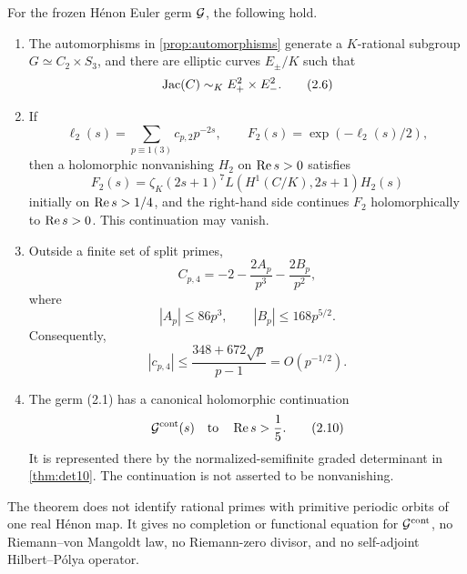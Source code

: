 \begin{theorem}\label{thm:main}
For the frozen H\'enon Euler germ \(\mathcal G\), the following hold.
\begin{enumerate}
\item The automorphisms in \cref{prop:automorphisms} generate a
\(K\)-rational subgroup \(G\simeq C_2\times S_3\), and there are elliptic
curves \(E_\pm/K\) such that
\[
 \operatorname{Jac}(C)\sim_K E_+^2\times E_-^2.                      \tag{2.6}
\]
\item If
\[
 \ell_2(s)=\sum_{p\equiv1(3)}c_{p,2}p^{-2s},\qquad
 F_2(s)=\exp(-\ell_2(s)/2),
\]
then a holomorphic nonvanishing \(H_2\) on \(\operatorname{Re} s>0\) satisfies
\[
 F_2(s)=\zeta_K(2s+1)^7L(H^1(C/K),2s+1)H_2(s)          \tag{2.7}
\]
initially on \(\operatorname{Re} s>1/4\), and the right-hand side continues \(F_2\)
holomorphically to \(\operatorname{Re} s>0\).  This continuation may vanish.
\item Outside a finite set of split primes,
\[
 C_{p,4}=-2-\frac{2A_p}{p^3}-\frac{2B_p}{p^2},          \tag{2.8}
\]
where
\[
 |A_p|\le86p^3,\qquad |B_p|\le168p^{5/2}.
\]
Consequently,
\[
 |c_{p,4}|
 \le\frac{348+672\sqrt p}{p-1}=O(p^{-1/2}).             \tag{2.9}
\]
\item The germ (2.1) has a canonical holomorphic continuation
\[
 \mathcal G^{\mathrm{cont}}(s)\quad\text{to}\quad
 \operatorname{Re} s>\frac15.                                    \tag{2.10}
\]
It is represented there by the normalized-semifinite graded determinant
in \cref{thm:det10}.  The continuation is not asserted to be nonvanishing.
\end{enumerate}
\end{theorem}

\begin{remark}[Scope]\label{rem:scope}
The theorem does not identify rational primes with primitive periodic orbits
of one real H\'enon map.  It gives no completion or functional equation for
\(\mathcal G^{\mathrm{cont}}\), no Riemann--von Mangoldt law, no Riemann-zero
divisor, and no self-adjoint Hilbert--P\'olya operator.
\end{remark}
